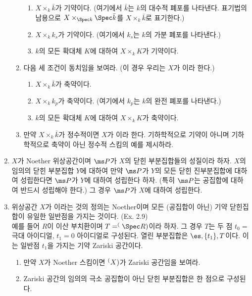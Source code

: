 \begin{enumerate}[label=\tb{3.\arabic*.},itemindent=0mm,itemsep=2mm]
\begin{enumerate}[label=(\alph*)]
\begin{enumerate}[label=(\roman*)]
	\item $X\times_k\bar k$가 기약이다. (여기에서 $\bar k$는 $k$의 대수적 폐포를 나타낸다.
	표기법의 남용으로 $X\times_{\Spec k}\Spec \bar k$를 $X\times_k\bar k$로 표기한다.)
	\item $X\times_kk_s$가 기약이다. (여기에서 $k_s$는 $k$의 가분 폐포를 나타낸다.)
	\item $k$의 모든 확대체 $K$에 대하여 $X\times_kK$가 기약이다.\\[-2mm]
	\end{enumerate}
	\item 다음 세 조건이 동치임을 보여라. (이 경우 우리는 $X$가 이라 한다.)\\[-2mm]
	\begin{enumerate}[label=(\roman*)]
	\item $X\times_k\bar k$가 축약이다.
	\item $X\times_kk_p$가 축약이다. (여기에서 $k_p$는 $k$의 완전 폐포를 나타낸다.)
	\item $k$의 모든 확대체 $K$에 대하여 $X\times_kK$가 축약이다.\\[-2mm]
	\end{enumerate}
	\item 만약 $X\times_k\bar k$가 정수적이면 $X$가 이라 한다.
	기하학적으로 기약이 아니며 기하학적으로 축약이 아닌 정수적 스킴의 예를 제시하라.
	\end{enumerate}
	\item {} $X$가 Noether 위상공간이며 $\ms P$가 $X$의 닫힌 부분집합들의 성질이라 하자.
	$X$의 임의의 닫힌 부분집합 $Y$에 대하여 만약 $\ms P$가 $Y$의 모든 닫힌 진부분집합에 대하여 성립한다면
	$\ms P$가 $Y$에 대하여 성립한다 하자. (특히 $\ms P$는 공집합에 대하여 반드시 성립해야 한다.)
	그 경우 $\ms P$가 $X$에 대하여 성립한다.
	\item {} 위상공간 $X$가 이라는 것의 정의는 Noether이며
	모든 (공집합이 아닌) 기약 닫힌집합이 유일한 일반점을 가지는 것이다. (Ex. 2.9)\\
	예를 들어 $R$이 이산 부치환이며 $T=\sp(\Spec R)$이라 하자. 그 경우 $T$는 두 점 $t_0=$극대 아이디얼, $t_1=0$ 아이디얼로 구성된다.
	열린 부분집합은 $\es,\{t_1\},T$이다. 이는 일반점 $t_1$을 가지는 기약 Zariski 공간이다.
	\begin{enumerate}[label=(\alph*)]
	\item 만약 $X$가 Noether 스킴이면 $\sp(X)$가 Zariski 공간임을 보여라.
	\item Zariski 공간의 임의의 극소 공집합이 아닌 닫힌 부분집합은 한 점으로 구성된다.

\end{enumerate}
\end{enumerate}
